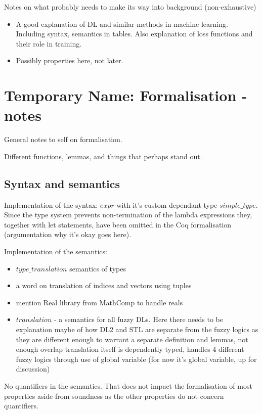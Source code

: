 \documentclass[a4paper,UKenglish,cleveref, autoref, thm-restate]{lipics-v2021}
\begin{document}
Notes on what probably needs to make its way into background (non-exhaustive)
\begin{itemize}
	\item A good explanation of DL and similar methods in machine learning. Including syntax, semantics in tables. Also explanation of loss functions and their role in training.
	\item Possibly properties here, not later.
\end{itemize}






\section{Temporary Name: Formalisation - notes}

General notes to self on formalisation.

Different functions, lemmas, and things that perhaps stand out.

\subsection{Syntax and semantics}

Implementation of the syntax: $expr$ with it's custom dependant type $simple\_type$. Since the type system prevents non-termination of the lambda expressions they, together with let statements, have been omitted in the Coq formalisation (argumentation why it's okay goes here).



Implementation of the semantics: 
\begin{itemize}
	\item $type\_translation$ semantics of types
	\item a word on translation of indices and vectors using tuples
	\item mention Real library from MathComp to handle reals
	\item $translation$ - a semantics for all fuzzy DLs. Here there needs to be explanation maybe of how DL2 and STL are separate from the fuzzy logics as they are different enough to warrant a separate definition and lemmas, not enough overlap
	translation itself is dependently typed, handles 4 different fuzzy logics through use of global variable (for now it's global variable, up for discussion)
	
\end{itemize}

No quantifiers in the semantics. That does not impact the formalisation of most properties aside from soundness as the other properties do not concern quantifiers.
\end{document}
